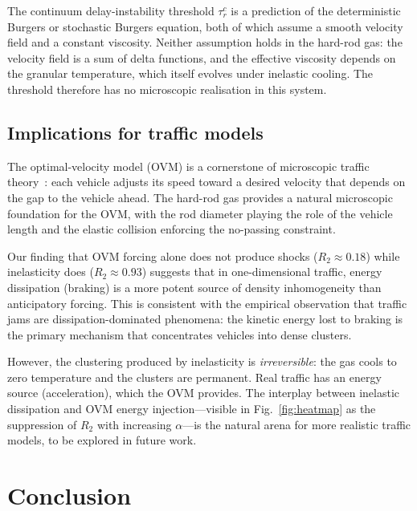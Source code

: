 \documentclass[aps,pre,twocolumn,superscriptaddress,longbibliography,floatfix]{revtex4-2}
\begin{document}
The continuum delay-instability threshold $\tau_r^c$ is a
prediction of the deterministic Burgers or stochastic Burgers
equation, both of which assume a smooth velocity field and a
constant viscosity. Neither assumption holds in the hard-rod gas:
the velocity field is a sum of delta functions, and the effective
viscosity depends on the granular temperature, which itself
evolves under inelastic cooling. The threshold therefore has no
microscopic realisation in this system.

\subsection{Implications for traffic models}

The optimal-velocity model (OVM) is a cornerstone of microscopic
traffic theory~\cite{Bando1995,Sugiyama2008}: each vehicle adjusts
its speed toward a desired velocity that depends on the gap to
the vehicle ahead. The hard-rod gas provides a natural microscopic
foundation for the OVM, with the rod diameter playing the role of
the vehicle length and the elastic collision enforcing the
no-passing constraint.

Our finding that OVM forcing alone does not produce shocks
($R_2 \approx 0.18$) while inelasticity does ($R_2 \approx
0.93$) suggests that in one-dimensional traffic, energy
dissipation (braking) is a more potent source of density
inhomogeneity than anticipatory forcing. This is consistent with
the empirical observation that traffic jams are
dissipation-dominated phenomena: the kinetic energy lost to
braking is the primary mechanism that concentrates vehicles into
dense clusters.

However, the clustering produced by inelasticity is
\emph{irreversible}: the gas cools to zero temperature and the
clusters are permanent. Real traffic has an energy source
(acceleration), which the OVM provides. The interplay between
inelastic dissipation and OVM energy injection---visible in
Fig.~\ref{fig:heatmap} as the suppression of $R_2$ with
increasing $\alpha$---is the natural arena for more realistic
traffic models, to be explored in future work.

\section{Conclusion}
\label{sec:conclusion}
\end{document}

